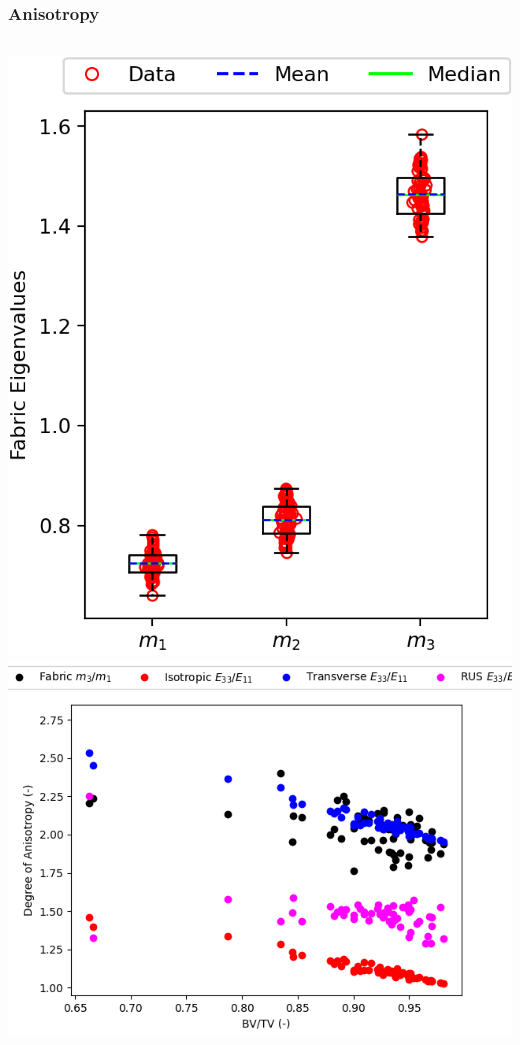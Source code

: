 \documentclass[xcolor=table,11pt]{beamer}
\begin{document}
	\begin{frame}
		\frametitle{Anisotropy}
		\vfill
		\begin{columns}
			\centering
			\includegraphics[width=\linewidth]{05_Homogenization/Plots/FabricEigenvalues}\\
			\centering
			\includegraphics[width=\linewidth]{05_Homogenization/Plots/AnisotropyBVTV}\\
		\end{columns}
		\vfill
	\end{frame}
\end{document}
